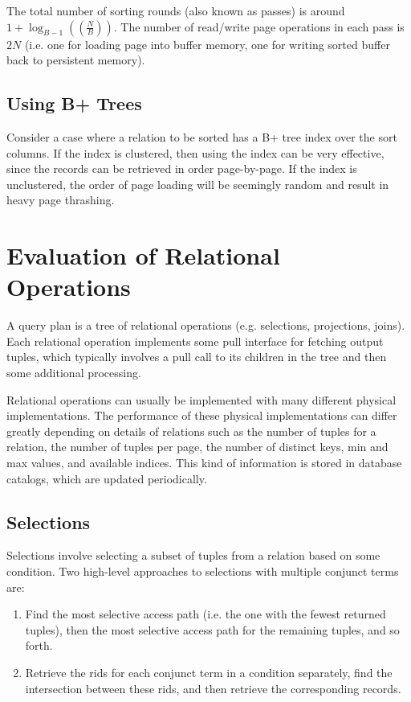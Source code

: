\documentclass[12pt,titlepage]{article}
\let\stdsection\section
\renewcommand\section{\clearpage\stdsection}
\begin{document}
      The total number of sorting rounds (also known as passes) is around $1 + \log_{B-1}((\frac{N}{B}))$. The number of read/write page operations in each
      pass is $2N$ (i.e. one for loading page into buffer memory, one for writing sorted buffer back to persistent memory).

    \subsection{Using B+ Trees}
      Consider a case where a relation to be sorted has a B+ tree index over the sort columns. If the index is clustered, then using the index can be very
      effective, since the records can be retrieved in order page-by-page. If the index is unclustered, the order of page loading will be seemingly random
      and result in heavy page thrashing.

  \section{Evaluation of Relational Operations}
    A query plan is a tree of relational operations (e.g. selections, projections, joins). Each relational operation implements some pull interface for fetching
    output tuples, which typically involves a pull call to its children in the tree and then some additional processing.

    Relational operations can usually be implemented with many different physical implementations. The performance of these physical implementations can differ greatly
    depending on details of relations such as the number of tuples for a relation, the number of tuples per page, the number of distinct keys, min and max values,
    and available indices. This kind of information is stored in database catalogs, which are updated periodically.

    \subsection{Selections}
      Selections involve selecting a subset of tuples from a relation based on some condition. Two high-level approaches to selections with multiple conjunct
      terms are:

      \begin{enumerate}
        \item Find the most selective access path (i.e. the one with the fewest returned tuples), then the most selective access path for the remaining
          tuples, and so forth.
        \item Retrieve the rids for each conjunct term in a condition separately, find the intersection between these rids, and then retrieve the corresponding
          records.
      \end{enumerate}
\end{document}
